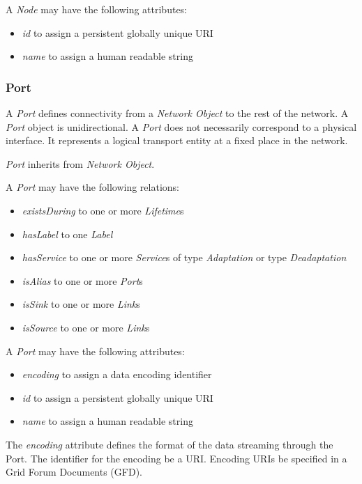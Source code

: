 A \emph{Node} may have the following attributes:
\begin{itemize}
    \item \emph{id} to assign a persistent globally unique URI
    \item \emph{name} to assign a human readable string
\end{itemize}



\subsubsection{Port}%
\label{class:port}

A \emph{Port} defines connectivity from a \emph{Network Object} to the rest of the network. A \emph{Port} object is unidirectional. A \emph{Port} does not necessarily correspond to a physical interface. It represents a logical transport entity at a fixed place in the network.

\emph{Port} inherits from \emph{Network Object}.

A \emph{Port} may have the following relations:
\begin{itemize}
    \item \emph{existsDuring} to one or more \emph{Lifetime}s
    \item \emph{hasLabel} to one \emph{Label}
    \item \emph{hasService} to one or more \emph{Service}s of type \emph{Adaptation} or type \emph{Deadaptation}
    \item \emph{isAlias} to one or more \emph{Port}s
    \item \emph{isSink} to one or more \emph{Link}s
    \item \emph{isSource} to one or more \emph{Link}s
\end{itemize}

A \emph{Port} may have the following attributes:
\begin{itemize}
    \item \emph{encoding} to assign a data encoding identifier
    \item \emph{id} to assign a persistent globally unique URI
    \item \emph{name} to assign a human readable string
\end{itemize}

The \emph{encoding} attribute defines the format of the data streaming through the Port. The identifier for the encoding \MUST{} be a URI. Encoding URIs \SHOULD{} be specified in a Grid Forum Documents (GFD).


